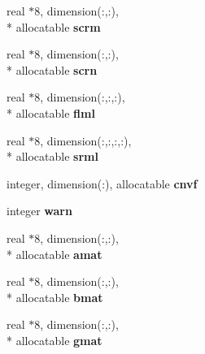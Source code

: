 \begin{DoxyCompactItemize}
\item 
\hypertarget{classsolvar_ad0ad5f0816aca0106d4134aab048b587}{real $\ast$8, dimension(\-:,\-:), \\*
allocatable {\bfseries scrm}}\label{classsolvar_ad0ad5f0816aca0106d4134aab048b587}

\item 
\hypertarget{classsolvar_afc399fa0331d458dd61344f29e86c2b0}{real $\ast$8, dimension(\-:,\-:), \\*
allocatable {\bfseries scrn}}\label{classsolvar_afc399fa0331d458dd61344f29e86c2b0}

\item 
\hypertarget{classsolvar_a44ac6f0ee1f3ef4e2dd9ac365a56ea1e}{real $\ast$8, dimension(\-:,\-:,\-:), \\*
allocatable {\bfseries flml}}\label{classsolvar_a44ac6f0ee1f3ef4e2dd9ac365a56ea1e}

\item 
\hypertarget{classsolvar_a93d4e25e0a75a026fc99fad34fb16f92}{real $\ast$8, dimension(\-:,\-:,\-:,\-:), \\*
allocatable {\bfseries srml}}\label{classsolvar_a93d4e25e0a75a026fc99fad34fb16f92}

\item 
\hypertarget{classsolvar_af5b34b344517ef2166afc04c426e27a2}{integer, dimension(\-:), allocatable {\bfseries cnvf}}\label{classsolvar_af5b34b344517ef2166afc04c426e27a2}

\item 
\hypertarget{classsolvar_a77a98f936638344888462eef093e6580}{integer {\bfseries warn}}\label{classsolvar_a77a98f936638344888462eef093e6580}

\item 
\hypertarget{classsolvar_a58627fb8898ac77ba68157b4335132dd}{real $\ast$8, dimension(\-:,\-:), \\*
allocatable {\bfseries amat}}\label{classsolvar_a58627fb8898ac77ba68157b4335132dd}

\item 
\hypertarget{classsolvar_a20f6846ca2c1dcc99975895992079c4a}{real $\ast$8, dimension(\-:,\-:), \\*
allocatable {\bfseries bmat}}\label{classsolvar_a20f6846ca2c1dcc99975895992079c4a}

\item 
\hypertarget{classsolvar_a52d7e95aa15399c2d8374e4d81fa4786}{real $\ast$8, dimension(\-:,\-:), \\*
allocatable {\bfseries gmat}}\label{classsolvar_a52d7e95aa15399c2d8374e4d81fa4786}


\end{DoxyCompactItemize}
